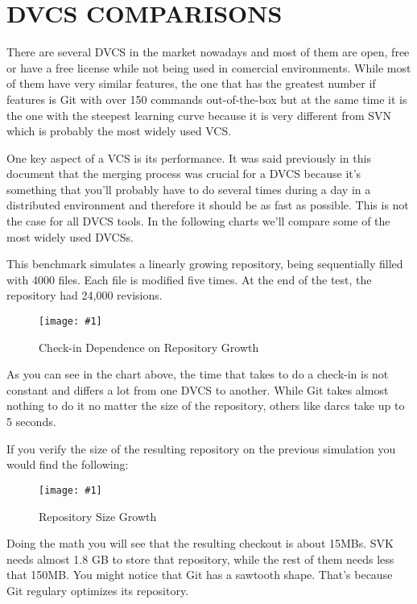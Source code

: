 \documentclass[a4paper,10pt]{article}
\newcommand{\diagrama}[2]{
    \begin{figure}[h]
        \begin{center}
            \texttt{[image: \#1]} 
        \end{center}
        \caption{#2}
    \end{figure}
}
\begin{document}
\section{DVCS COMPARISONS}
\label{DVCS COMPARISONS}

There are several DVCS in the market nowadays and most of them are open, free or have a free license while not being used in comercial environments. While most of them have very similar features, the one that has the greatest number if features is Git with over 150 commands out-of-the-box but at the same time it is the one with the steepest learning curve because it is very different from SVN which is probably the most widely used VCS.

One key aspect of a VCS is its performance. It was said previously in this document that the merging process was crucial for a DVCS because it's something that you'll probably have to do several times during a day in a distributed environment and therefore it should be as fast as possible. This is not the case for all DVCS tools. In the following charts\cite{dvcsperfcomparison} we'll compare some of the most widely used DVCSs.

This benchmark simulates a linearly growing repository, being sequentially filled with 4000 files. Each file is modified five times. At the end of the test, the repository had 24,000 revisions. 

\diagrama{dvcs_roundup_plot_commits.jpg}{Check-in Dependence on Repository Growth}

As you can see in the chart above, the time that takes to do a check-in is not constant and differs a lot from one DVCS to another. While Git takes almost nothing to do it no matter the size of the repository, others like darcs take up to 5 seconds.

If you verify the size of the resulting repository on the previous simulation you would find the following:

\diagrama{dvcs_roundup_plot_sizes.jpg}{Repository Size Growth}

Doing the math you will see that the resulting checkout is about 15MBs. SVK needs almost 1.8 GB to store that repository, while the rest of them needs less that 150MB. You might notice that Git has a sawtooth shape. That's because Git regulary optimizes its repository.
\end{document}
